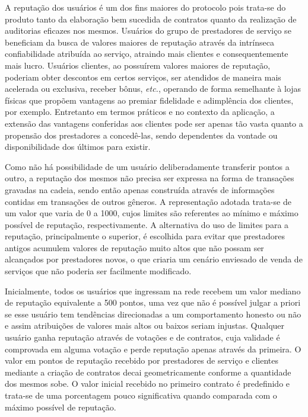 A reputação dos usuários é um dos fins maiores do protocolo pois trata-se do produto tanto da elaboração bem sucedida de contratos quanto da realização de auditorias eficazes nos mesmos. Usuários do grupo de prestadores de serviço se beneficiam da busca de valores maiores de reputação através da intrínseca confiabilidade atribuída ao serviço, atraindo mais clientes e consequentemente mais lucro. Usuários clientes, ao possuírem valores maiores de reputação, poderiam obter descontos em certos serviços, ser atendidos de maneira mais acelerada ou exclusiva, receber bônus, \textit{etc.}, operando de forma semelhante à lojas físicas que propõem vantagens ao premiar fidelidade e adimplência dos clientes, por exemplo. Entretanto em termos práticos e no contexto da aplicação, a extensão das vantagens conferidas aos clientes pode ser apenas tão vasta quanto a propensão dos prestadores a concedê-las, sendo dependentes da vontade ou disponibilidade dos últimos para existir.

%
Como não há possibilidade de um usuário deliberadamente transferir pontos a outro, a reputação dos mesmos não precisa ser expressa na forma de transações gravadas na cadeia, sendo então apenas construída através de informações contidas em transações de outros gêneros. 
%
A representação adotada trata-se de um valor que varia de 0 a 1000, cujos limites são referentes ao mínimo e máximo possível de reputação, respectivamente. A alternativa do uso de limites para a reputação, principalmente o superior, é escolhida para evitar que prestadores antigos acumulem valores de reputação muito altos que não possam ser alcançados por prestadores novos, o que criaria um cenário enviesado de venda de serviços que não poderia ser facilmente modificado.
%

Inicialmente, todos os usuários que ingressam na rede recebem um valor mediano de reputação equivalente a 500 pontos, uma vez que não é possível julgar a priori se esse usuário tem tendências direcionadas a um comportamento honesto ou não e assim atribuições de valores mais altos ou baixos seriam injustas. Qualquer usuário ganha reputação através de votações e de contratos, cuja validade é comprovada em alguma votação e perde reputação apenas através da primeira. O valor em pontos de reputação recebido por prestadores de serviço e clientes mediante a criação de contratos decai geometricamente conforme a quantidade dos mesmos sobe. O valor inicial recebido no primeiro contrato é predefinido e trata-se de uma porcentagem pouco significativa quando comparada com o máximo possível de reputação. 


